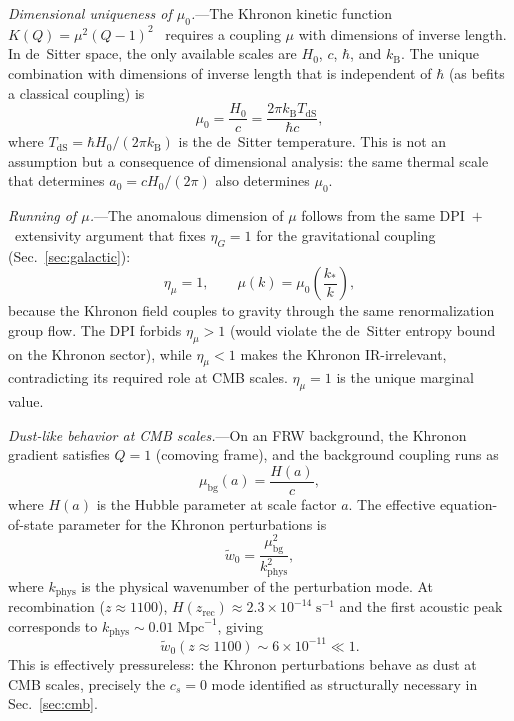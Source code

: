 \documentclass[prd,twocolumn,superscriptaddress,longbibliography,floatfix]{revtex4-2}
\newcommand{\kB}{k_{\mathrm{B}}}
\begin{document}
\emph{Dimensional uniqueness of $\mu_0$.}---The Khronon kinetic
function $K(Q) = \mu^2(Q - 1)^2$~\cite{Blanchet2024} requires
a coupling $\mu$ with dimensions of inverse length.  In
de~Sitter space, the only available scales are $H_0$, $c$, $\hbar$,
and $\kB$.  The unique combination with dimensions of inverse
length that is independent of $\hbar$ (as befits a classical
coupling) is
\begin{equation}
\mu_0 = \frac{H_0}{c}
= \frac{2\pi \kB T_{\mathrm{dS}}}{\hbar c},
\label{eq:mu0}
\end{equation}
where $T_{\mathrm{dS}} = \hbar H_0/(2\pi \kB)$ is the
de~Sitter temperature.  This is not an assumption but a
consequence of dimensional analysis: the same thermal scale
that determines $a_0 = cH_0/(2\pi)$ also determines
$\mu_0$.

\emph{Running of $\mu$.}---The anomalous dimension of $\mu$
follows from the same DPI~$+$~extensivity argument that
fixes $\eta_G = 1$ for the gravitational coupling
(Sec.~\ref{sec:galactic}):
\begin{equation}
\eta_\mu = 1, \qquad
\mu(k) = \mu_0\!\left(\frac{k_*}{k}\right),
\label{eq:mu_running}
\end{equation}
because the Khronon field couples to gravity through the same
renormalization group flow.  The DPI forbids $\eta_\mu > 1$
(would violate the de~Sitter entropy bound on the Khronon
sector), while $\eta_\mu < 1$ makes the Khronon IR-irrelevant,
contradicting its required role at CMB scales.
$\eta_\mu = 1$ is the unique marginal value.

\emph{Dust-like behavior at CMB scales.}---On an FRW
background, the Khronon gradient satisfies $Q = 1$ (comoving
frame), and the background coupling runs as
\begin{equation}
\mu_{\mathrm{bg}}(a) = \frac{H(a)}{c},
\label{eq:mu_bg}
\end{equation}
where $H(a)$ is the Hubble parameter at scale factor $a$.
The effective equation-of-state parameter for the Khronon
perturbations is~\cite{Blanchet2024}
\begin{equation}
\tilde{w}_0 = \frac{\mu_{\mathrm{bg}}^2}{k_{\mathrm{phys}}^2},
\label{eq:w_tilde}
\end{equation}
where $k_{\mathrm{phys}}$ is the physical wavenumber of the
perturbation mode.  At recombination ($z \approx 1100$),
$H(z_{\mathrm{rec}}) \approx 2.3 \times 10^{-14}\;
\mathrm{s}^{-1}$ and the first acoustic peak corresponds to
$k_{\mathrm{phys}} \sim 0.01\;\mathrm{Mpc}^{-1}$, giving
\begin{equation}
\tilde{w}_0(z \approx 1100) \sim 6 \times 10^{-11}
\ll 1.
\label{eq:w_dust}
\end{equation}
This is effectively pressureless: the Khronon perturbations
behave as dust at CMB scales, precisely the $c_s = 0$ mode
identified as structurally necessary in
Sec.~\ref{sec:cmb}.
\end{document}
